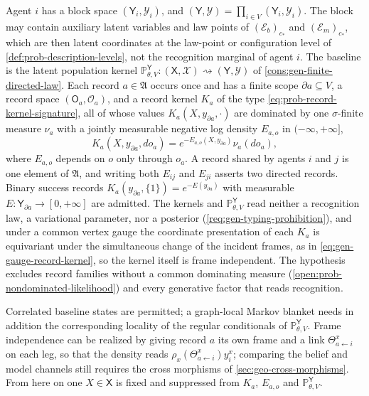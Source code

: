 Agent $i$ has a block space $(\mathsf Y_i,\mathscr Y_i)$, and
$(\mathsf Y,\mathscr Y)=\prod_{i\in V}(\mathsf Y_i,\mathscr Y_i)$. The block may
contain auxiliary latent variables and law points of $(\mathcal E_b)_{c_*}$ and
$(\mathcal E_m)_{c_*}$, which are then latent coordinates at the law-point or
configuration level of \cref{def:prob-description-levels}, not the recognition
marginal of agent $i$. The baseline is the latent population kernel
$\mathbb P^{\mathsf Y}_{\theta,V}:(\mathsf X,\mathscr X)\rightsquigarrow(\mathsf Y,\mathscr Y)$
of \cref{cons:gen-finite-directed-law}. Each record $a\in\mathfrak A$ occurs
once and has a finite scope $\partial a\subseteq V$, a record space
$(\mathsf O_a,\mathscr O_a)$, and a record kernel $K_a$ of the type
\eqref{eq:prob-record-kernel-signature}, all of whose values
$K_a(X,y_{\partial a},\cdot)$ are dominated by one $\sigma$-finite measure
$\nu_a$ with a jointly measurable negative log density $E_{a,o}$ in
$(-\infty,+\infty]$,
\begin{equation}
K_a(X,y_{\partial a},do_a)=e^{-E_{a,o}(X,y_{\partial a})}\nu_a(do_a),
\label{eq:obs-interaction-density}
\end{equation}
where $E_{a,o}$ depends on $o$ only through $o_a$. A record shared by agents
$i$ and $j$ is one element of $\mathfrak A$, and writing both $E_{ij}$ and
$E_{ji}$ asserts two directed records. Binary success records
$K_a(y_{\partial a},\{1\})=e^{-E(y_{\partial a})}$ with measurable
$E:\mathsf Y_{\partial a}\to[0,+\infty]$ are admitted. The kernels and
$\mathbb P^{\mathsf Y}_{\theta,V}$ read neither a recognition law, a
variational parameter, nor a posterior (\cref{req:gen-typing-prohibition}),
and under a common vertex gauge the coordinate presentation of each $K_a$ is
equivariant under the simultaneous change of the incident frames, as in
\eqref{eq:gen-gauge-record-kernel}, so the kernel itself is frame independent.
The hypothesis excludes record families without a common dominating measure
(\cref{open:prob-nondominated-likelihood}) and every generative factor that
reads recognition.

Correlated baseline states are permitted; a graph-local Markov blanket needs in
addition the corresponding locality of the regular conditionals of
$\mathbb P^{\mathsf Y}_{\theta,V}$. Frame independence can be realized by giving
record $a$ its own frame and a link $\Theta^x_{a\leftarrow i}$ on each leg, so
that the density reads $\rho_x(\Theta^x_{a\leftarrow i})y^x_i$; comparing the
belief and model channels still requires the cross morphisms of
\cref{sec:geo-cross-morphisms}. From here on one $X\in\mathsf X$ is fixed and
suppressed from $K_a$, $E_{a,o}$ and $\mathbb P^{\mathsf Y}_{\theta,V}$.

